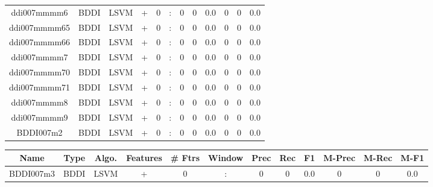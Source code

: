 \documentclass[a4paper]{article}
\begin{document}
\begin{landscape}
\begin{center}
\begin{tabular}{ |c|c|c|c|c|c|c|c|c|c|c|c|}
 
 	
 	\small{ ddi007mmmm6 } & BDDI & LSVM & +  &  0 &  :  &  0 & 0 & 0.0  &  0 & 0 & 0.0 \\
 	

 
 	
 	\small{ ddi007mmmm65 } & BDDI & LSVM & +  &  0 &  :  &  0 & 0 & 0.0  &  0 & 0 & 0.0 \\
 	

 
 	
 	\small{ ddi007mmmm66 } & BDDI & LSVM & +  &  0 &  :  &  0 & 0 & 0.0  &  0 & 0 & 0.0 \\
 	

 
 	
 	\small{ ddi007mmmm7 } & BDDI & LSVM & +  &  0 &  :  &  0 & 0 & 0.0  &  0 & 0 & 0.0 \\
 	

 
 	
 	\small{ ddi007mmmm70 } & BDDI & LSVM & +  &  0 &  :  &  0 & 0 & 0.0  &  0 & 0 & 0.0 \\
 	

 
 	
 	\small{ ddi007mmmm71 } & BDDI & LSVM & +  &  0 &  :  &  0 & 0 & 0.0  &  0 & 0 & 0.0 \\
 	

 
 	
 	\small{ ddi007mmmm8 } & BDDI & LSVM & +  &  0 &  :  &  0 & 0 & 0.0  &  0 & 0 & 0.0 \\
 	

 
 	
 	\small{ ddi007mmmm9 } & BDDI & LSVM & +  &  0 &  :  &  0 & 0 & 0.0  &  0 & 0 & 0.0 \\
 	

 
 	
 	\small{ BDDI007m2 } & BDDI & LSVM & +  &  0 &  :  &  0 & 0 & 0.0  &  0 & 0 & 0.0 \\
 	
 \hline
\end{tabular}
\end{center}




\begin{center}
\begin{tabular}{ |c|c|c|c|c|c|c|c|c|c|c|c|} 
 \hline
 	Name & Type & Algo. & Features & \# Ftrs & Window & Prec & Rec & F1 & M-Prec & M-Rec & M-F1\\
 \hline

 	

 
 	
 	\small{ BDDI007m3 } & BDDI & LSVM & +  &  0 &  :  &  0 & 0 & 0.0  &  0 & 0 & 0.0 \\
 	


\end{tabular}
\end{center}
\end{landscape}
\end{document}
